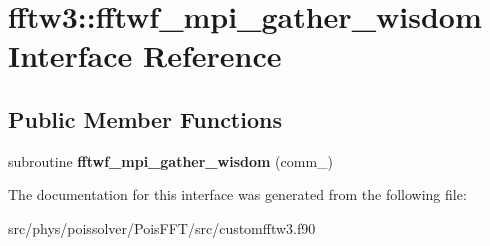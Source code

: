 \hypertarget{interfacefftw3_1_1fftwf__mpi__gather__wisdom}{}\section{fftw3\+:\+:fftwf\+\_\+mpi\+\_\+gather\+\_\+wisdom Interface Reference}
\label{interfacefftw3_1_1fftwf__mpi__gather__wisdom}
\subsection*{Public Member Functions}
\begin{DoxyCompactItemize}
\item 
subroutine {\bfseries fftwf\+\_\+mpi\+\_\+gather\+\_\+wisdom} (comm\+\_\+)\hypertarget{interfacefftw3_1_1fftwf__mpi__gather__wisdom_accfc389ed1419a0774e13afac22ecae6}{}\label{interfacefftw3_1_1fftwf__mpi__gather__wisdom_accfc389ed1419a0774e13afac22ecae6}

\end{DoxyCompactItemize}


The documentation for this interface was generated from the following file\+:\begin{DoxyCompactItemize}
\item 
src/phys/poissolver/\+Pois\+F\+F\+T/src/customfftw3.\+f90\end{DoxyCompactItemize}
